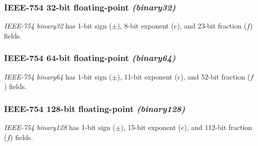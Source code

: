 \begin{samepage}
\subsubsection{IEEE-754 32-bit floating-point \emph{(binary32)}}

\emph{IEEE-754 binary32} has 1-bit sign ($\pm$), 8-bit exponent ($e$),
and 23-bit fraction ($f$) fields.

\vspace{0.5em}

\par\noindent
{}
\end{samepage}

\begin{samepage}
\subsubsection{IEEE-754 64-bit floating-point \emph{(binary64)}}

\emph{IEEE-754 binary64} has 1-bit sign ($\pm$), 11-bit exponent ($e$),
and 52-bit fraction ($f$) fields.

\vspace{0.5em}

\par\noindent
{}
\end{samepage}

\begin{samepage}
\subsubsection{IEEE-754 128-bit floating-point \emph{(binary128)}}

\emph{IEEE-754 binary128} has 1-bit sign ($\pm$), 15-bit exponent ($e$),
and 112-bit fraction ($f$) fields.

\vspace{0.5em}

\par\noindent
{}
\end{samepage}

